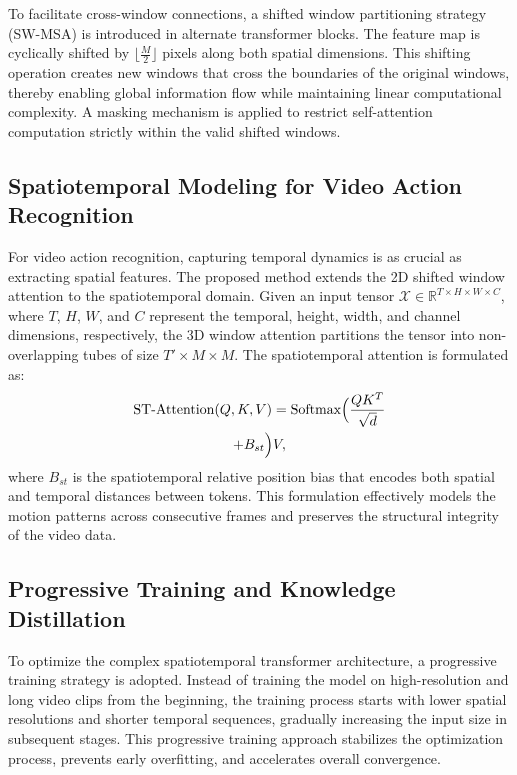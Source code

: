 \documentclass[lettersize,journal]{IEEEtran}
\begin{document}
To facilitate cross-window connections, a shifted window partitioning strategy (SW-MSA) is introduced in alternate transformer blocks. The feature map is cyclically shifted by $\lfloor \frac{M}{2} \rfloor$ pixels along both spatial dimensions. This shifting operation creates new windows that cross the boundaries of the original windows, thereby enabling global information flow while maintaining linear computational complexity. A masking mechanism is applied to restrict self-attention computation strictly within the valid shifted windows.

\subsection{Spatiotemporal Modeling for Video Action Recognition}
For video action recognition, capturing temporal dynamics is as crucial as extracting spatial features. The proposed method extends the 2D shifted window attention to the spatiotemporal domain. Given an input tensor $\mathcal{X} \in \mathbb{R}^{T \times H \times W \times C}$, where $T$, $H$, $W$, and $C$ represent the temporal, height, width, and channel dimensions, respectively, the 3D window attention partitions the tensor into non-overlapping tubes of size $T' \times M \times M$. The spatiotemporal attention is formulated as:
\begin{multline}

\text{ST-Attention}(Q, K, V) = \text{Softmax}\Bigl(\frac{QK^T}{\sqrt{d}} \\
+ B_{st}\Bigr)V,
\end{multline}
where $B_{st}$ is the spatiotemporal relative position bias that encodes both spatial and temporal distances between tokens. This formulation effectively models the motion patterns across consecutive frames and preserves the structural integrity of the video data.

\subsection{Progressive Training and Knowledge Distillation}
To optimize the complex spatiotemporal transformer architecture, a progressive training strategy is adopted. Instead of training the model on high-resolution and long video clips from the beginning, the training process starts with lower spatial resolutions and shorter temporal sequences, gradually increasing the input size in subsequent stages. This progressive training approach stabilizes the optimization process, prevents early overfitting, and accelerates overall convergence.
\end{document}
